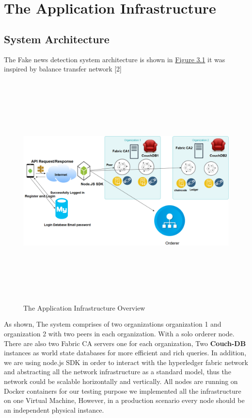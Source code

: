 \chapter{The Application Infrastructure}

\section{System Architecture}

The Fake news detection system architecture is shown in \hyperref[fig:infrastructure]{Figure 3.1} it was inspired by balance transfer network [2]
 \begin{figure}[H]
\includegraphics[width=15cm,height=12cm]{images/infrastructure.png}
\caption{The Application Infrastructure Overview}
\label{fig:infrastructure}
\end{figure}
\cleardoublepage

As shown, The system comprises of two organizations organization 1 and organization 2 with two peers in each organization. 
With a solo orderer node.  There are also two Fabric CA servers one for each organization, Two \textbf{Couch-DB} instances as world state databases for more efficient and rich queries. 
In addition, we are using node.js SDK in order to interact with the hyperledger fabric network and abstracting all the network infrastructure as a standard model, thus the network could be scalable horizontally and vertically. All nodes are running on Docker containers for our testing purpose we implemented all the infrastructure on one Virtual Machine, However, in a production scenario every node should be an independent physical instance. \\ 

